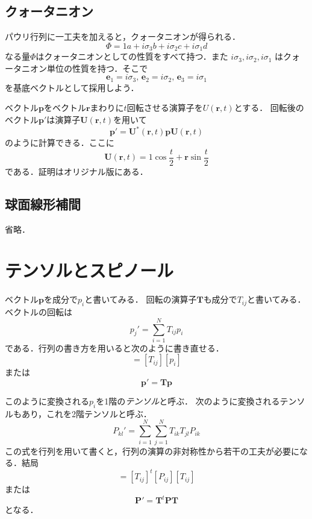 \documentclass{jsbook}
\newcommand{\keyword}[1]{\emph{#1}}
\newcommand{\bvec}[1]{\boldsymbol{#1}}
\newcommand{\bop}[1]{\boldsymbol{#1}}
\newcommand{\im}{i}%
\newcommand{\ve}{\bvec{e}}
\begin{document}
\subsection{クォータニオン}

パウリ行列に一工夫を加えると，クォータニオンが得られる．
\begin{equation}
\varPhi=1a+\im\sigma_3b+\im\sigma_2c+\im\sigma_1d
\end{equation}
なる量$\varPhi$はクォータニオンとしての性質をすべて持つ．また $\im\sigma_3,\im\sigma_2,\im\sigma_1$ はクォータニオン単位の性質を持つ．そこで
\begin{equation}
\ve_1=\im\sigma_3,\,
\ve_2=\im\sigma_2,\,
\ve_3=\im\sigma_1
\end{equation}
を基底ベクトルとして採用しよう．

ベクトル$\bvec{p}$をベクトル$\bvec{r}$まわりに$t$回転させる演算子を$U(\bvec{r},t)$とする．
回転後のベクトル$\bvec{p}'$は演算子$\bop{U}(\bvec{r},t)$を用いて
\begin{equation}
\bvec{p}'=\bop{U}^*(\bvec{r},t)\bvec{p}\bop{U}(\bvec{r},t)
\end{equation}
のように計算できる．ここに
\begin{equation}
\bop{U}(\bvec{r},t)=1\cos\frac{t}{2}+\bvec{r}\sin\frac{t}{2}
\end{equation}
である．証明はオリジナル版にある．

\subsection{球面線形補間}

省略．

\section{テンソルとスピノール}

ベクトル$\bvec{p}$を成分で$p_i$と書いてみる．
回転の演算子$\bop{T}$も成分で$T_{ij}$と書いてみる．
ベクトルの回転は
\begin{equation}
p_j'=\sum_{i=1}^NT_{ij}p_i
\end{equation}
である．行列の書き方を用いると次のように書き直せる．
\begin{equation}
[p_i']=[T_{ij}][p_i]
\end{equation}
または
\begin{equation}
\bvec{p}'=\bop{T}\bvec{p}
\end{equation}

このように変換される$p_i$を1階の\keyword{テンソル}と呼ぶ．
次のように変換されるテンソルもあり，これを2階テンソルと呼ぶ．
\begin{equation}
P_{kl}'=\sum_{i=1}^N\sum_{j=1}^NT_{ik}T_{jl}P_{ik}
\end{equation}
この式を行列を用いて書くと，行列の演算の非対称性から若干の工夫が必要になる．結局
\begin{equation}
[P_{ij}']=[T_{ij}]^t[P_{ij}][T_{ij}]
\end{equation}
または
\begin{equation}
\bvec{P}'=\bop{T}^t\bvec{P}\bop{T}
\end{equation}
となる．
\end{document}
